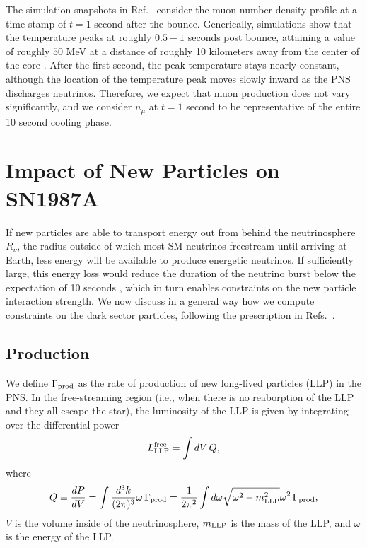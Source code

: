 \documentclass[11pt]{article}
\begin{document}
The simulation snapshots in Ref.~\cite{Bollig:2020xdr} consider the muon number density profile at a time stamp of $t=1$ second after the bounce. Generically, simulations show that the temperature peaks at roughly $0.5-1$ seconds post bounce, attaining a value of roughly $50$ MeV at a distance of roughly 10 kilometers away from the center of the core \cite{Raffelt:1996wa,Burrows:1986me}.
After the first second, the peak temperature stays nearly constant, although the location of the temperature peak moves slowly inward as the PNS discharges neutrinos.
Therefore, we expect that muon production does not vary significantly, and we consider $n_\mu$ at $t=1$ second to be representative of the entire 10 second cooling phase.

\section{Impact of New Particles on SN1987A}
\label{sec:impact}
If new particles are able to transport energy out from behind the neutrinosphere $R_\nu$, the radius outside of which most SM neutrinos freestream until arriving at Earth, less energy will be available to produce energetic neutrinos. If sufficiently large, this energy loss would reduce the duration of the neutrino burst below the expectation of 10 seconds \cite{Burrows:1990pk}, which in turn enables constraints on the new particle interaction strength.
We now discuss in a general way how we compute constraints on the dark sector particles, following the prescription in Refs.~\cite{Raffelt:1996wa,Chang:2016ntp,Chang:2018rso}. 

\subsection{Production}

We define $\Gamma_{\rm prod}$ as the rate of production of new long-lived particles (LLP) in the PNS.
In the free-streaming region (i.e., when there is no reaborption of the LLP and they all escape the star), the luminosity of the LLP is given by integrating over the differential power
\begin{equation} 
\label{L-new-free}
    L_{\rm LLP}^{\rm free} = \int dV \,Q,
\end{equation}
where
\begin{equation}
    Q \equiv \frac{dP}{dV} = \int \frac{d^3 k}{(2\pi)^3} \omega \, \Gamma_{\rm prod} = \frac1{2\pi^2} \int d \omega \sqrt{\omega^2-m_{\rm LLP}^2} \omega^2 \, \Gamma_{\rm prod} ,
    \label{eq:q}
\end{equation}
$V$ is the volume inside of the neutrinosphere, $m_{\rm LLP}$ is the mass of the LLP, and $\omega$ is the energy of the LLP.
\end{document}
